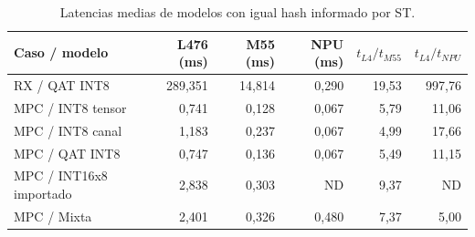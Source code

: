 \begin{table}[H]
\centering\small
\caption{Latencias medias de modelos con igual hash informado por ST.}\label{tab:comparacion_placas}
\begin{tabularx}{\linewidth}{Yrrrrr}\toprule
Caso / modelo & L476 (ms) & M55 (ms) & NPU (ms) & $t_{L4}/t_{M55}$ & $t_{L4}/t_{NPU}$\\\midrule
RX / QAT INT8 & 289,351 & 14,814 & 0,290 & 19,53 & 997,76\\
MPC / INT8 tensor & 0,741 & 0,128 & 0,067 & 5,79 & 11,06\\
MPC / INT8 canal & 1,183 & 0,237 & 0,067 & 4,99 & 17,66\\
MPC / QAT INT8 & 0,747 & 0,136 & 0,067 & 5,49 & 11,15\\
MPC / INT16x8 importado & 2,838 & 0,303 & ND & 9,37 & ND\\
MPC / Mixta & 2,401 & 0,326 & 0,480 & 7,37 & 5,00\\
\bottomrule\end{tabularx}
\end{table}
